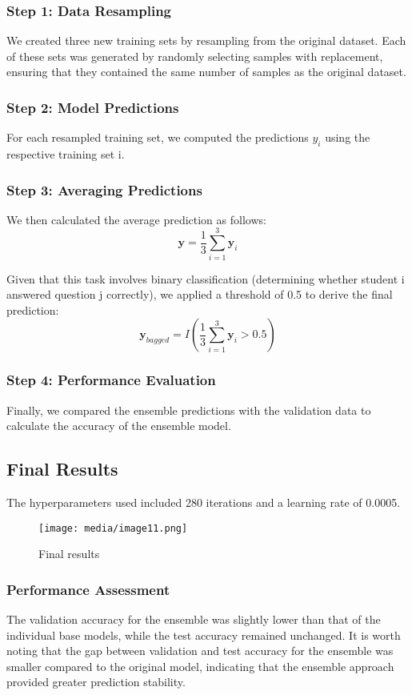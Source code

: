 \documentclass{article}
\begin{document}
\subsubsection{Step 1: Data Resampling}
We created three new training sets by resampling from the original dataset. Each of these sets was generated by randomly selecting samples with replacement, ensuring that they contained the same number of samples as the original dataset.

\subsubsection{Step 2: Model Predictions}
For each resampled training set, we computed the predictions $y_i$ using the respective training set i.

\subsubsection{Step 3: Averaging Predictions}
We then calculated the average prediction as follows:
\[\mathbf{y} = \frac{1}{3}\sum_{i = 1}^{3}{\mathbf{y}_{i}}\]

Given that this task involves binary classification (determining whether student i answered question j correctly), we applied a threshold of 0.5 to derive the final prediction:
\[\mathbf{y}_{bagged} = I\left( \frac{1}{3}\sum_{i = 1}^{3}{\mathbf{y}_{i}} > 0.5 \right)\]

\subsubsection{Step 4: Performance Evaluation}
Finally, we compared the ensemble predictions with the validation data to calculate the accuracy of the ensemble model.

\subsection{Final Results}

The hyperparameters used included 280 iterations and a learning rate of 0.0005.

\begin{figure}[htbp]
\centering
\texttt{[image: media/image11.png]}
\caption{Final results}
\end{figure}

\subsubsection{Performance Assessment}
The validation accuracy for the ensemble was slightly lower than that of the individual base models, while the test accuracy remained unchanged. It is worth noting that the gap between validation and test accuracy for the ensemble was smaller compared to the original model, indicating that the ensemble approach provided greater prediction stability.
\end{document}
